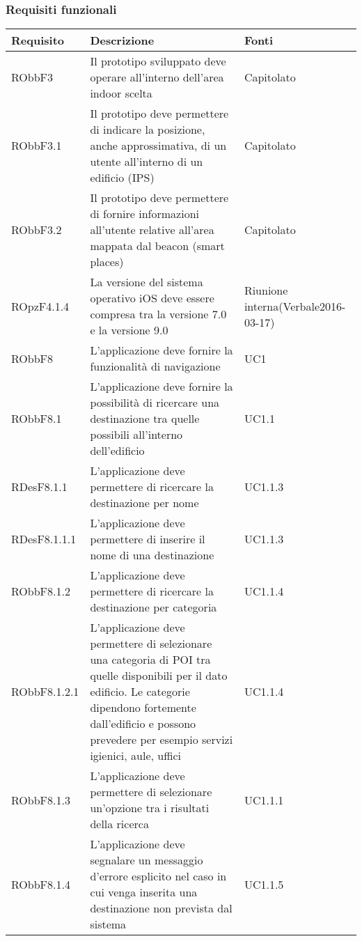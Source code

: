 \documentclass[../AnalisiDeiRequisiti.tex]{subfiles}
\begin{document}
\subsubsection{Requisiti funzionali}
\begin{longtabu} to \textwidth {X X[2] X}
\toprule
\textbf{Requisito} & \textbf{Descrizione} & \textbf{Fonti}\\
\midrule
\endhead
{}
RObbF3 & Il prototipo sviluppato deve operare all'interno dell'area indoor scelta & Capitolato \\ 
\midrule 
RObbF3.1 & Il prototipo deve permettere di indicare la posizione, anche approssimativa, di un utente all'interno di un edificio (IPS) & Capitolato \\ 
\midrule 
RObbF3.2 & Il prototipo deve permettere di fornire informazioni all'utente relative all'area mappata dal beacon (smart places) & Capitolato \\ 
\midrule 
ROpzF4.1.4 & La versione del sistema operativo iOS deve essere compresa tra la versione 7.0 e la versione 9.0 & Riunione interna(Verbale2016-03-17) \\ 
\midrule 
RObbF8 & L'applicazione deve fornire la funzionalità di navigazione & UC1 \\ 
\midrule 
RObbF8.1 & L'applicazione deve fornire la possibilità di ricercare una destinazione tra quelle possibili all'interno dell'edificio & UC1.1 \\ 
\midrule 
RDesF8.1.1 & L'applicazione deve permettere di ricercare la destinazione per nome & UC1.1.3 \\ 
\midrule 
RDesF8.1.1.1 & L'applicazione deve permettere di inserire il nome di una destinazione & UC1.1.3 \\ 
\midrule 
RObbF8.1.2 & L'applicazione deve permettere di ricercare la destinazione per categoria & UC1.1.4 \\ 
\midrule 
RObbF8.1.2.1 & L'applicazione deve permettere di selezionare una categoria di POI tra quelle disponibili per il dato edificio. Le categorie dipendono fortemente dall'edificio e possono prevedere per esempio servizi igienici, aule, uffici & UC1.1.4 \\ 
\midrule 
RObbF8.1.3 & L'applicazione deve permettere di selezionare un'opzione tra i risultati della ricerca & UC1.1.1 \\ 
\midrule 
RObbF8.1.4 & L'applicazione deve segnalare un messaggio d'errore esplicito nel caso in cui venga inserita una destinazione non prevista dal sistema & UC1.1.5 \\ 

\end{longtabu}
\end{document}
